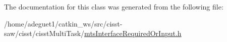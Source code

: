 The documentation for this class was generated from the following file\-:\begin{DoxyCompactItemize}
\item 
/home/adeguet1/catkin\-\_\-ws/src/cisst-\/saw/cisst/cisst\-Multi\-Task/\hyperlink{mts_interface_required_or_input_8h}{mts\-Interface\-Required\-Or\-Input.\-h}\end{DoxyCompactItemize}
